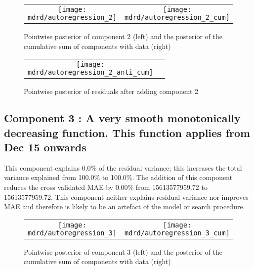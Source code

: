 \documentclass{article} %
\begin{document}
\begin{figure}[H]
\newcommand{\wmgd}{0.5\columnwidth}
\newcommand{\hmgd}{3.0cm}
\newcommand{\mdrd}{autoregression}
\newcommand{\mbm}{\hspace{-0.3cm}}
\begin{tabular}{cc}
\mbm \texttt{[image: \\mdrd/autoregression\_2]} & \texttt{[image: \\mdrd/autoregression\_2\_cum]}
\end{tabular}
\caption{Pointwise posterior of component 2 (left) and the posterior of the cumulative sum of components with data (right)}
\label{fig:comp2}
\end{figure}

\begin{figure}[H]
\newcommand{\wmgd}{0.5\columnwidth}
\newcommand{\hmgd}{3.0cm}
\newcommand{\mdrd}{autoregression}
\newcommand{\mbm}{\hspace{-0.3cm}}
\begin{tabular}{cc}
\mbm \texttt{[image: \\mdrd/autoregression\_2\_anti\_cum]}
\end{tabular}
\caption{Pointwise posterior of residuals after adding component 2}
\label{fig:comp2}
\end{figure}

\subsection{Component 3 : A very smooth monotonically decreasing function. This function applies from Dec   15 onwards}



This component explains 0.0\% of the residual variance; this increases the total variance explained from 100.0\% to 100.0\%.
The addition of this component reduces the cross validated MAE by 0.00\% from 15613577959.72 to 15613577959.72.
This component neither explains residual variance nor improves MAE and therefore is likely to be an artefact of the model or search procedure.

\begin{figure}[H]
\newcommand{\wmgd}{0.5\columnwidth}
\newcommand{\hmgd}{3.0cm}
\newcommand{\mdrd}{autoregression}
\newcommand{\mbm}{\hspace{-0.3cm}}
\begin{tabular}{cc}
\mbm \texttt{[image: \\mdrd/autoregression\_3]} & \texttt{[image: \\mdrd/autoregression\_3\_cum]}
\end{tabular}
\caption{Pointwise posterior of component 3 (left) and the posterior of the cumulative sum of components with data (right)}
\label{fig:comp3}
\end{figure}
\end{document}
